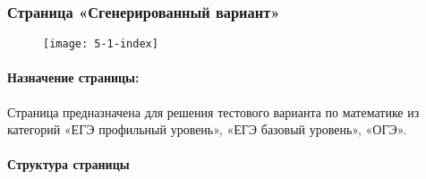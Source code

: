 \subsubsection{Страница «Сгенерированный вариант»}
\begin{figure}[H]
	\texttt{[image: 5-1-index]}
\end{figure}
\paragraph{Назначение страницы:} Страница предназначена для решения тестового варианта по математике из категорий «ЕГЭ профильный уровень», «ЕГЭ базовый уровень», «ОГЭ».

\paragraph{Структура страницы}
